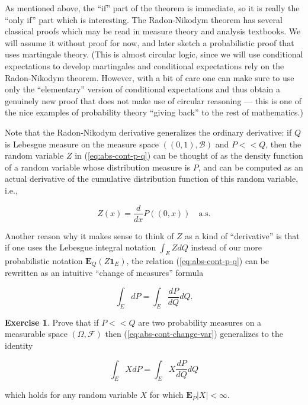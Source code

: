 \documentclass[11pt]{report}
\theoremstyle{plain}
\theoremstyle{definition}
\newtheorem{xexercise}[thm]{Exercise}
\begin{document}
As mentioned above, the ``if'' part of the theorem is immediate, so it is really the ``only if'' part which is interesting. The Radon-Nikodym theorem has several classical proofs which may be read in measure theory and analysis textbooks. We will assume it without proof for now, and later sketch a probabilistic proof that uses martingale theory. (This is almost circular logic, since we will use conditional expectations to develop martingales and conditional expectations rely on the Radon-Nikodym theorem. However, with a bit of care one can make sure to use only the ``elementary'' version of conditional expectations and thus obtain a genuinely new proof that does not make use of circular reasoning --- this is one of the nice examples of probability theory ``giving back'' to the rest of mathematics.)

Note that the Radon-Nikodym derivative generalizes the ordinary derivative: if $Q$ is Lebesgue measure on the measure space $((0,1),\mathcal{B})$ and $P<<Q$, then the random variable $Z$ in (\ref{eq:abs-cont-p-q}) can be thought of as the density function of a random variable whose distribution measure is $P$, and can be computed as an actual derivative of the cumulative distribution function of this random variable, i.e.,

\[
Z(x) = \frac{d}{dx} P((0,x)) \quad\textrm{a.s.}
\]

Another reason why it makes sense to think of $Z$ as a kind of ``derivative'' is that if one uses the Lebesgue integral notation $\int_E Z dQ$ instead of our more probabilistic notation $\mathbf{E}_{Q}(Z\mathbf{1}_E)$, the relation (\ref{eq:abs-cont-p-q}) can be rewritten as an intuitive ``change of measures'' formula

\begin{equation*} \tag{6}\label{eq:abs-cont-change-var}
\int_E dP = \int_E \frac{dP}{dQ} dQ.
\end{equation*}

\begin{xexercise}
Prove that if $P<<Q$ are two probability measures on a measurable space $(\Omega, \mathcal{F})$ then (\ref{eq:abs-cont-change-var}) generalizes to the identity

\[
\int_E X dP = \int_E X \frac{dP}{dQ} dQ
\]

which holds for any random variable $X$ for which $\mathbf{E}_P|X|<\infty$.
\end{xexercise}
\end{document}
